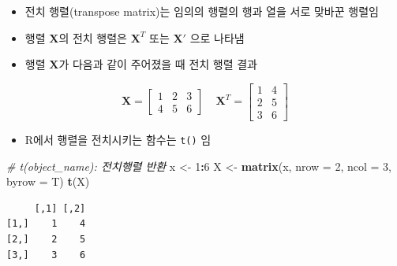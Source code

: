 \documentclass[
  11pt,
]{krantz}
\newenvironment{Shaded}{\begin{snugshade}}{\end{snugshade}}
\newcommand{\CommentTok}[1]{\textcolor[rgb]{0.37,0.37,0.37}{\textit{#1}}}
\newcommand{\DataTypeTok}[1]{\textcolor[rgb]{0.27,0.27,0.27}{#1}}
\newcommand{\DecValTok}[1]{\textcolor[rgb]{0.06,0.06,0.06}{#1}}
\newcommand{\FloatTok}[1]{\textcolor[rgb]{0.06,0.06,0.06}{#1}}
\newcommand{\KeywordTok}[1]{\textcolor[rgb]{0.27,0.27,0.27}{\textbf{#1}}}
\newcommand{\NormalTok}[1]{#1}
\newcommand{\OperatorTok}[1]{\textcolor[rgb]{0.43,0.43,0.43}{\textbf{#1}}}
\newcommand{\StringTok}[1]{\textcolor[rgb]{0.5,0.5,0.5}{#1}}
\providecommand{\tightlist}{%
  \setlength{\itemsep}{0pt}\setlength{\parskip}{0pt}}
\begin{document}
\begin{itemize}
\tightlist
\item
  전치 행렬(transpose matrix)는 임의의 행렬의 행과 열을 서로 맞바꾼 행렬임
\item
  행렬 \(\mathrm{\mathbf X}\)의 전치 행렬은 \(\mathrm{\mathbf X}^T\) 또는 \(\mathrm{\mathbf X}'\) 으로 나타냄
\item
  행렬 \(\mathrm{\mathbf X}\)가 다음과 같이 주어졌을 때 전치 행렬 결과
\end{itemize}

\[\mathrm{\mathbf{X}} = \begin{bmatrix}
1 & 2 & 3\\
4 & 5 & 6
\end{bmatrix} ~~~~~
\mathrm{\mathbf{X}}^T = 
\begin{bmatrix}
1 & 4 \\
2 & 5 \\ 
3 & 6
\end{bmatrix} 
\]

\begin{itemize}
\tightlist
\item
  R에서 행렬을 전치시키는 함수는 \texttt{t()} 임
\end{itemize}

\footnotesize

\begin{Shaded}
\begin{Highlighting}[]
\CommentTok{# t(object_name): 전치행렬 반환}
\NormalTok{x <-}\StringTok{ }\DecValTok{1}\OperatorTok{:}\DecValTok{6}
\NormalTok{X <-}\StringTok{ }\KeywordTok{matrix}\NormalTok{(x, }\DataTypeTok{nrow =} \DecValTok{2}\NormalTok{, }\DataTypeTok{ncol =} \DecValTok{3}\NormalTok{, }\DataTypeTok{byrow =}\NormalTok{ T)}
\KeywordTok{t}\NormalTok{(X)}
\end{Highlighting}
\end{Shaded}

\begin{verbatim}
     [,1] [,2]
[1,]    1    4
[2,]    2    5
[3,]    3    6
\end{verbatim}

\begin{Shaded}
\end{Shaded}
\end{document}
